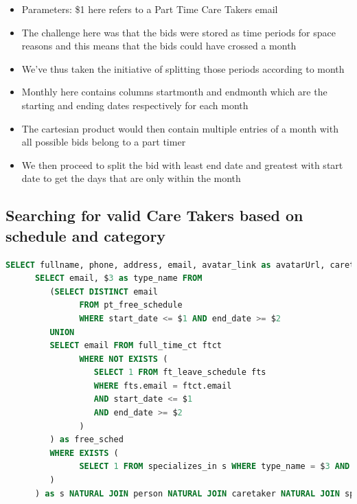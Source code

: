 \documentclass[
  paper=a4,
  ,captions=tableheading
]{scrartcl}
\providecommand{\tightlist}{%
  \setlength{\itemsep}{0pt}\setlength{\parskip}{0pt}}
\begin{document}
\begin{itemize}
\tightlist
\item
  Parameters: \$1 here refers to a Part Time Care Takers email
\item
  The challenge here was that the bids were stored as time periods for
  space reasons and this means that the bids could have crossed a month
\item
  We've thus taken the initiative of splitting those periods according
  to month
\item
  Monthly here contains columns startmonth and endmonth which are the
  starting and ending dates respectively for each month
\item
  The cartesian product would then contain multiple entries of a month
  with all possible bids belong to a part timer
\item
  We then proceed to split the bid with least end date and greatest with
  start date to get the days that are only within the month
\end{itemize}

\hypertarget{searching-for-valid-care-takers-based-on-schedule-and-category}{%
\subsection{Searching for valid Care Takers based on schedule and
category}\label{searching-for-valid-care-takers-based-on-schedule-and-category}}

\begin{lstlisting}[language=SQL]
SELECT fullname, phone, address, email, avatar_link as avatarUrl, caretaker_status as caretakerStatus, rating, ct_price_daily as ctPriceDaily, type_name as typeName FROM (
      SELECT email, $3 as type_name FROM 
         (SELECT DISTINCT email 
               FROM pt_free_schedule 
               WHERE start_date <= $1 AND end_date >= $2
         UNION
         SELECT email FROM full_time_ct ftct
               WHERE NOT EXISTS (
                  SELECT 1 FROM ft_leave_schedule fts
                  WHERE fts.email = ftct.email
                  AND start_date <= $1
                  AND end_date >= $2
               )
         ) as free_sched
         WHERE EXISTS (
               SELECT 1 FROM specializes_in s WHERE type_name = $3 AND s.email=free_sched.email
         )
      ) as s NATURAL JOIN person NATURAL JOIN caretaker NATURAL JOIN specializes_in
\end{lstlisting}
\end{document}
